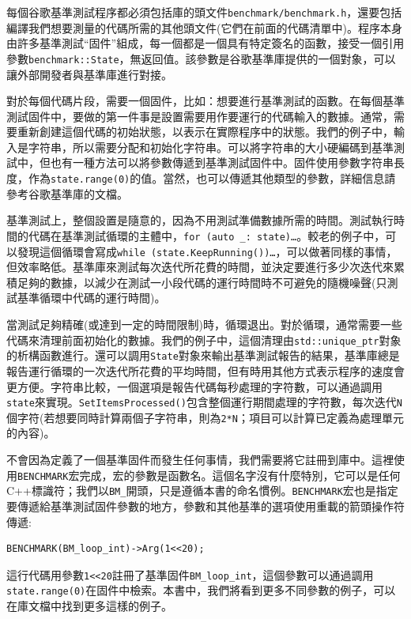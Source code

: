 每個谷歌基準測試程序都必須包括庫的頭文件\texttt{benchmark/benchmark.h}，還要包括編譯我們想要測量的代碼所需的其他頭文件(它們在前面的代碼清單中)。程序本身由許多基準測試“固件”組成，每一個都是一個具有特定簽名的函數，接受一個引用參數\texttt{benchmark::State}，無返回值。該參數是谷歌基準庫提供的一個對象，可以讓外部開發者與基準庫進行對接。

對於每個代碼片段，需要一個固件，比如：想要進行基準測試的函數。在每個基準測試固件中，要做的第一件事是設置需要用作要運行的代碼輸入的數據。通常，需要重新創建這個代碼的初始狀態，以表示在實際程序中的狀態。我們的例子中，輸入是字符串，所以需要分配和初始化字符串。可以將字符串的大小硬編碼到基準測試中，但也有一種方法可以將參數傳遞到基準測試固件中。固件使用參數字符串長度，作為\texttt{state.range(0)}的值。當然，也可以傳遞其他類型的參數，詳細信息請參考谷歌基準庫的文檔。

基準測試上，整個設置是隨意的，因為不用測試準備數據所需的時間。測試執行時間的代碼在基準測試循環的主體中，\texttt{for (auto \_: state){…}}。較老的例子中，可以發現這個循環會寫成\texttt{while (state.KeepRunning()){…}}，可以做著同樣的事情，但效率略低。基準庫來測試每次迭代所花費的時間，並決定要進行多少次迭代來累積足夠的數據，以減少在測試一小段代碼的運行時間時不可避免的隨機噪聲(只測試基準循環中代碼的運行時間)。

當測試足夠精確(或達到一定的時間限制)時，循環退出。對於循環，通常需要一些代碼來清理前面初始化的數據。我們的例子中，這個清理由\texttt{std::unique\_ptr}對象的析構函數進行。還可以調用\texttt{State}對象來輸出基準測試報告的結果，基準庫總是報告運行循環的一次迭代所花費的平均時間，但有時用其他方式表示程序的速度會更方便。字符串比較，一個選項是報告代碼每秒處理的字符數，可以通過調用\texttt{state}來實現。\texttt{SetItemsProcessed()}包含整個運行期間處理的字符數，每次迭代\texttt{N}個字符(若想要同時計算兩個子字符串，則為\texttt{2*N}；項目可以計算已定義為處理單元的內容)。

不會因為定義了一個基準固件而發生任何事情，我們需要將它註冊到庫中。這裡使用\texttt{BENCHMARK}宏完成，宏的參數是函數名。這個名字沒有什麼特別，它可以是任何C++標識符；我們以\texttt{BM\_}開頭，只是遵循本書的命名慣例。\texttt{BENCHMARK}宏也是指定要傳遞給基準測試固件參數的地方，參數和其他基準的選項使用重載的箭頭操作符傳遞:

\begin{lstlisting}[style=styleCXX]
BENCHMARK(BM_loop_int)->Arg(1<<20);
\end{lstlisting}

這行代碼用參數\texttt{1<<20}註冊了基準固件\texttt{BM\_loop\_int}，這個參數可以通過調用\texttt{state.range(0)}在固件中檢索。本書中，我們將看到更多不同參數的例子，可以在庫文檔中找到更多這樣的例子。

